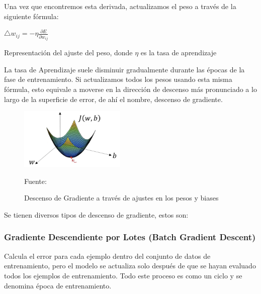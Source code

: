 		Una vez que encontremos esta derivada, actualizamos el peso a través de la siguiente fórmula:

		\begingroup\makeatletter{}\check@mathfonts
		\begin{center}
		$  \triangle w_{ij} = -\eta\frac{{\partial E}}{\partial w_{ij}} $
		\end{center}
		\begin{center}
		{\small{Representación del ajuste del peso, donde $\eta$ es la tasa de aprendizaje}}
		\end{center}
		\endgroup

		La tasa de Aprendizaje suele disminuir gradualmente durante las épocas de la fase de entrenamiento. Si actualizamos todos los pesos usando esta misma fórmula, esto equivale a moverse en la dirección de descenso más pronunciado a lo largo de la superficie de error, de ahí el nombre, descenso de gradiente.
		\begin{figure}[H]
		\begin{center}
		\includegraphics[width=0.45\textwidth]{images/desarrollo/entrenamiento/gradient}
		\end{center}
		\begin{center}
		\caption{\small{Descenso de Gradiente a través de ajustes en los pesos y biases}}
		\vspace{-0.5em}
		{\small{Fuente: \cite{gradientimg}}}
		\end{center}
		\vspace{-1.5em}
		\end{figure}

		Se tienen diversos tipos de descenso de gradiente, estos son:
		\subsubsection{Gradiente Descendiente por Lotes (Batch Gradient Descent)}
		
			Calcula el error para cada ejemplo dentro del conjunto de datos de entrenamiento, pero el modelo se actualiza solo después de que se hayan evaluado todos los ejemplos de entrenamiento. Todo este proceso es como un ciclo y se denomina época de entrenamiento.

